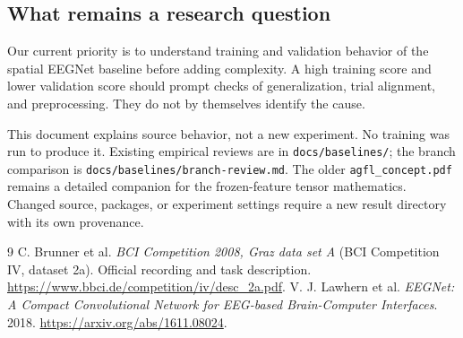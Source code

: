 \documentclass[11pt,a4paper]{article}
\newcommand{\code}[1]{{\small\nolinkurl{#1}}}
\begin{document}
\subsection*{What remains a research question}
Our current priority is to understand training and validation behavior of the
spatial EEGNet baseline before adding complexity. A high training score and
lower validation score should prompt checks of generalization, trial alignment,
and preprocessing. They do not by themselves identify the cause.

This document explains source behavior, not a new experiment. No training was
run to produce it. Existing empirical reviews are in \code{docs/baselines/};
the branch comparison is \code{docs/baselines/branch-review.md}. The older
\code{agfl_concept.pdf} remains a detailed companion for the frozen-feature
tensor mathematics. Changed source, packages, or experiment settings require a
new result directory with its own provenance.

\begin{thebibliography}{9}\small
{} C. Brunner et al. \emph{BCI Competition 2008, Graz data set A}
(BCI Competition IV, dataset 2a). Official recording and task description.
\url{https://www.bbci.de/competition/iv/desc_2a.pdf}.
 V. J. Lawhern et al. \emph{EEGNet: A Compact Convolutional
Network for EEG-based Brain-Computer Interfaces}. 2018.
\url{https://arxiv.org/abs/1611.08024}.
\end{thebibliography}
\end{document}
